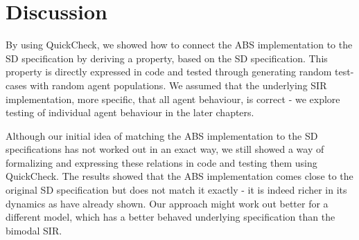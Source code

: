 \section{Discussion}
By using QuickCheck, we showed how to connect the ABS implementation to the SD specification by deriving a property, based on the SD specification. This property is directly expressed in code and tested through generating random test-cases with random agent populations. We assumed that the underlying SIR implementation, more specific, that all agent behaviour, is correct - we explore testing of individual agent behaviour in the later chapters.

Although our initial idea of matching the ABS implementation to the SD specifications has not worked out in an exact way, we still showed a way of formalizing and expressing these relations in code and testing them using QuickCheck. The results showed that the ABS implementation comes close to the original SD specification but does not match it exactly - it is indeed richer in its dynamics as \cite{macal_agent-based_2010, figueredo_comparing_2014} have already shown. Our approach might work out better for a different model, which has a better behaved underlying specification than the bimodal SIR. %